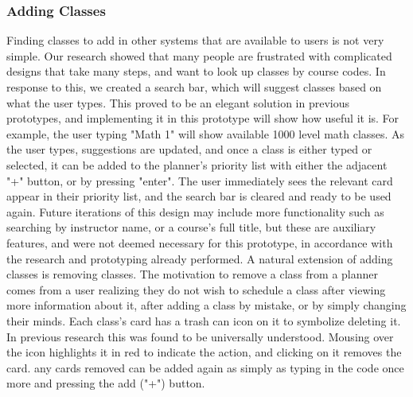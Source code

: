 \documentclass{article}
\begin{document}
\subsubsection{Adding Classes}

Finding classes to add in other systems that are available to users is not very simple. Our research showed that many people are frustrated with complicated designs that take many steps, and want to look up classes by course codes. In response to this, we created a search bar, which will suggest classes based on what the user types. This proved to be an elegant solution in previous prototypes, and implementing it in this prototype will show how useful it is. For example, the user typing "Math 1" will show available 1000 level math classes. As the user types, suggestions are updated, and once a class is either typed or selected, it can be added to the planner's priority list with either the adjacent "+" button, or by pressing "enter". The user immediately sees the relevant card appear in their priority list, and the search bar is cleared and ready to be used again. Future iterations of this design may include more functionality such as searching by instructor name, or a course's full title, but these are auxiliary features, and were not deemed necessary for this prototype, in accordance with the research and prototyping already performed.
\newline
\newline
A natural extension of adding classes is removing classes. The motivation to remove a class from a planner comes from a user realizing they do not wish to schedule a class after viewing more information about it, after adding a class by mistake, or by simply changing their minds. Each class's card has a trash can icon on it to symbolize deleting it. In previous research this was found to be universally understood. Mousing over the icon highlights it in red to indicate the action, and clicking on it removes the card. any cards removed can be added again as simply as typing in the code once more and pressing the add ("+") button.
\end{document}
